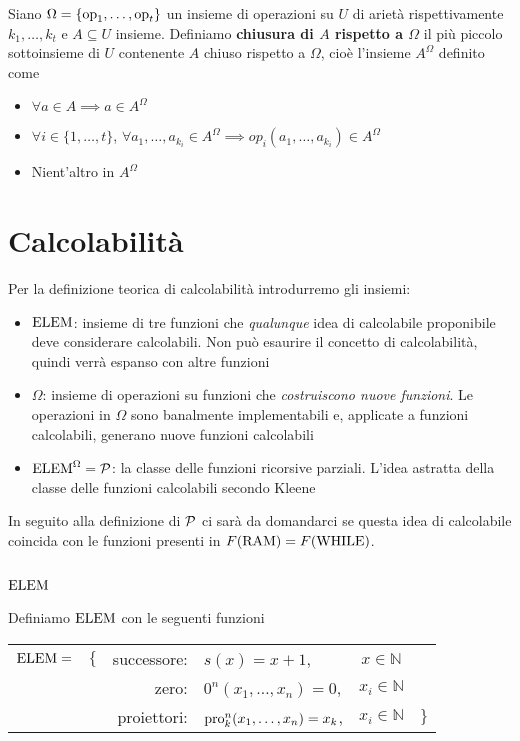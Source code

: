 Siano $\Omega = \{\operatorname{op}_1, \dots, \operatorname{op}_t\}$ un insieme di operazioni su $U$ di arietà rispettivamente $k_1, \dots, k_t$ e $A \subseteq U$ insieme. Definiamo \textbf{chiusura di $A$ rispetto a $\Omega$} il più piccolo sottoinsieme di $U$ contenente $A$ chiuso rispetto a $\Omega$, cioè l'insieme $A^\Omega$ definito come
\begin{itemize}
	\item $\forall a \in A \implies a \in A^\Omega$
	\item $\forall i \in \{1, \dots, t\}$, $\forall a_1, \dots, a_{k_i} \in A^\Omega \implies op_i \left(a_1, \dots, a_{k_i}\right) \in A^\Omega$
	\item Nient'altro in $A^\Omega$
\end{itemize}


\section{Calcolabilità}
Per la definizione teorica di calcolabilità introdurremo gli insiemi: 
\begin{itemize} 
	\item \textbf{$\text{ELEM}$}: insieme di tre funzioni che \textit{qualunque} idea di calcolabile proponibile deve considerare calcolabili. Non può esaurire il concetto di calcolabilità, quindi verrà espanso con altre funzioni
	
	\item $\Omega$: insieme di operazioni su funzioni che \textit{costruiscono nuove funzioni}. Le operazioni in $\Omega$ sono banalmente implementabili e, applicate a funzioni calcolabili, generano nuove funzioni calcolabili
	
	\item \textbf{$\text{ELEM}^\Omega = \mathcal{P}$}: la classe delle funzioni ricorsive parziali. L'idea astratta della classe delle funzioni calcolabili secondo Kleene
\end{itemize}

In seguito alla definizione di $\mathcal{P}$ ci sarà da domandarci se questa idea di calcolabile coincida con le funzioni presenti in $F(\text{RAM}) = F(\text{WHILE})$.\\

\subsection{$\text{ELEM}$}
Definiamo $\text{ELEM}$ con le seguenti funzioni
\begin{center}
	\begin{tabular}{r c r l c l}
		$\text{ELEM} = $ & $\{$ & successore: & $s(x) = x + 1$, & $x \in \mathbb{N}$ & \\
		&& zero: & $0^n (x_1, \dots, x_n) = 0$, & $x_i \in \mathbb{N}$ & \\
		&& proiettori: & $\text{pro}_k^n (x_1, \dots, x_n) = x_k$, & $x_i \in \mathbb{N}$& $\}$ \\
	\end{tabular}
\end{center}

